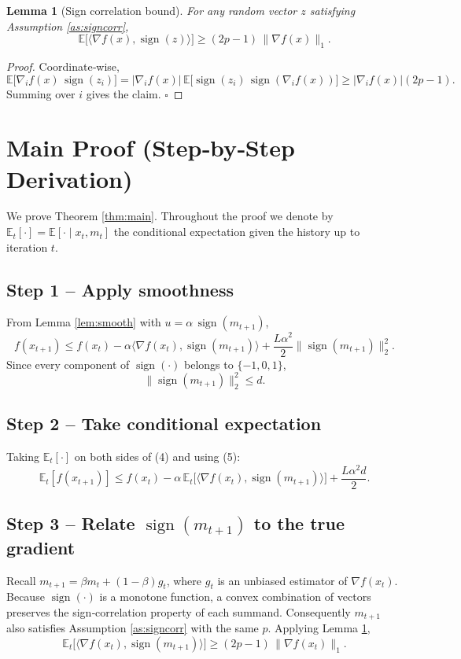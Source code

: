 \documentclass{article}
\newtheorem{lemma}{Lemma}
\begin{document}
\begin{lemma}[Sign correlation bound]\label{lem:signcorr}
For any random vector $z$ satisfying Assumption \ref{as:signcorr},
\[
\mathbb{E}\bigl[\langle\nabla f(x),\operatorname{sign}(z)\rangle\bigr]\ge (2p-1)\,\|\nabla f(x)\|_{1}.
\]
\end{lemma}
\begin{proof}
Coordinate‑wise,
\[
\mathbb{E}\bigl[\nabla_i f(x)\,\operatorname{sign}(z_i)\bigr]
= |\nabla_i f(x)|\,
\mathbb{E}\bigl[\operatorname{sign}(z_i)\,\operatorname{sign}(\nabla_i f(x))\bigr]
\ge |\nabla_i f(x)|(2p-1).
\]
Summing over $i$ gives the claim. \hfill $\square$
\end{proof}

\section*{Main Proof (Step‑by‑Step Derivation)}
We prove Theorem \ref{thm:main}.  Throughout the proof we denote by $\mathbb{E}_t[\cdot]=\mathbb{E}[\cdot\mid x_t,m_t]$ the conditional expectation given the history up to iteration $t$.

\subsection*{Step 1 – Apply smoothness}
From Lemma \ref{lem:smooth} with $u=\alpha\,\operatorname{sign}(m_{t+1})$,
\[
f(x_{t+1})\le f(x_t)-\alpha\langle\nabla f(x_t),\operatorname{sign}(m_{t+1})\rangle
+\frac{L\alpha^{2}}{2}\bigl\|\operatorname{sign}(m_{t+1})\bigr\|_2^{2}. \tag{4}
\]
Since every component of $\operatorname{sign}(\cdot)$ belongs to $\{-1,0,1\}$,
\[
\bigl\|\operatorname{sign}(m_{t+1})\bigr\|_2^{2}\le d. \tag{5}
\]

\subsection*{Step 2 – Take conditional expectation}
Taking $\mathbb{E}_t[\cdot]$ on both sides of (4) and using (5):
\[
\mathbb{E}_t[f(x_{t+1})]\le f(x_t)-\alpha\,
\mathbb{E}_t\!\bigl[\langle\nabla f(x_t),\operatorname{sign}(m_{t+1})\rangle\bigr]
+\frac{L\alpha^{2}d}{2}. \tag{6}
\]

\subsection*{Step 3 – Relate $\operatorname{sign}(m_{t+1})$ to the true gradient}
Recall $m_{t+1}= \beta m_t+(1-\beta)g_t$, where $g_t$ is an unbiased estimator of $\nabla f(x_t)$.  
Because $\operatorname{sign}(\cdot)$ is a monotone function, a convex combination of vectors preserves the sign‑correlation property of each summand.  Consequently $m_{t+1}$ also satisfies Assumption \ref{as:signcorr} with the same $p$.  Applying Lemma \ref{lem:signcorr},
\[
\mathbb{E}_t\!\bigl[\langle\nabla f(x_t),\operatorname{sign}(m_{t+1})\rangle\bigr]
\ge (2p-1)\,\|\nabla f(x_t)\|_{1}. \tag{7}
\]
\end{document}
